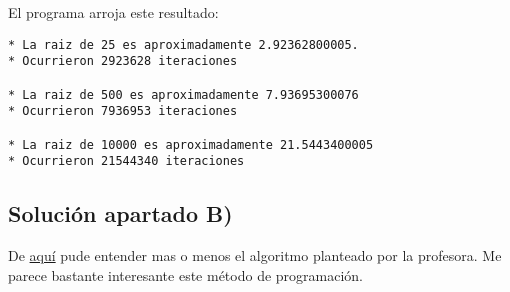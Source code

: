 \documentclass[11pt]{article}
\begin{document}
    El programa arroja este resultado:

\begin{verbatim}
* La raiz de 25 es aproximadamente 2.92362800005. 
* Ocurrieron 2923628 iteraciones 

* La raiz de 500 es aproximadamente 7.93695300076
* Ocurrieron 7936953 iteraciones 

* La raiz de 10000 es aproximadamente 21.5443400005
* Ocurrieron 21544340 iteraciones 
\end{verbatim}

    \subsection{Solución apartado B)}\label{soluciuxf3n-apartado-b}

De
\href{https://www.pybonacci.org/2012/04/18/ecuaciones-no-lineales-metodo-de-biseccion-y-metodo-de-newton-en-python/}{aquí}
pude entender mas o menos el algoritmo planteado por la profesora. Me
parece bastante interesante este método de programación.
\end{document}
